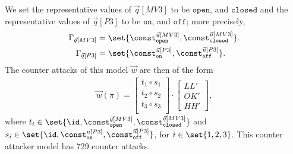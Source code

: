 {We set the representative values of $\vec{q}[MV3]$ to be $\texttt{open}$, and $\texttt{closed}$ and the representative values of $\vec{q}[P3]$ to be $\texttt{on}$, and $\texttt{off}$; more precisely, 
\begin{align*}
  \Gamma_{\vec{q}[MV3]}&=\set{\const^{\vec{u}[MV3]}_{\texttt{open}}, \const^{\vec{u}[MV3]}_{\texttt{closed}}}.\\
  \Gamma_{\vec{q}[P3]}&=\set{\const^{\vec{u}[P3]}_{\texttt{on}}, \const^{\vec{u}[P3]}_{\texttt{off}}}.
\end{align*}
The counter attacks of this model $\vec{w}$ are then of the form
\begin{align*}
  \vec{w}(\pi)=
  \begin{bmatrix}
    t_1\circ s_1 \\
    t_2\circ s_2 \\
    t_3\circ s_3 \\
  \end{bmatrix}
  \cdot
  \begin{bmatrix}
    LL' \\
    OK' \\
    HH'
  \end{bmatrix},
\end{align*} 
where $t_i\in \set{\id,\const^{\vec{q}[MV3]}_{\texttt{open}}, \const^{\vec{q}[MV3]}_{\texttt{closed}}}$ and  $s_i\in\set{\id,\const^{\vec{u}[P3]}_{\texttt{on}}, \const^{\vec{u}[P3]}_{\texttt{off}}}$, for $i\in \set{1,2,3}$. This counter attacker model has 729 counter attacks.

}
